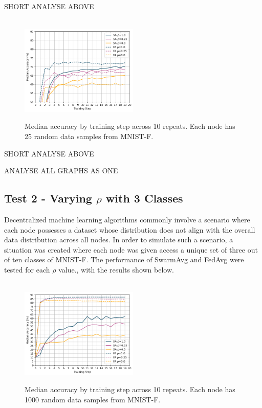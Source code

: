 \documentclass[letterpaper, 10 pt, conference]{ieeeconf}  %
\begin{document}
SHORT ANALYSE ABOVE

\begin{figure}[H] 
	 \\
	\includegraphics[width=0.5\textwidth]{conf_sparse_ns25}
	\caption{Median accuracy by training step across 10 repeats. Each node has 25 random data samples from MNIST-F.}
	\label{aeg6}
\end{figure}

SHORT ANALYSE ABOVE

ANALYSE ALL GRAPHS AS ONE

\subsection{Test 2 - Varying $\rho$ with 3 Classes}
Decentralized machine learning algorithms commonly involve a scenario where each node possesses a dataset whose distribution does not align with the overall data distribution across all nodes. In order to simulate such a scenario, a situation was created where each node was given access a unique set of three out of ten classes of MNIST-F. The performance of SwarmAvg and FedAvg were tested for each $\rho$ value., with the results shown below.


\begin{figure}[H]
	 \\
	\includegraphics[width=0.5\textwidth]{conf_sparse_ns1000_cl3}
	\caption{Median accuracy by training step across 10 repeats. Each node has 1000 random data samples from MNIST-F.}
	\label{aeg7}
\end{figure}
\end{document}
